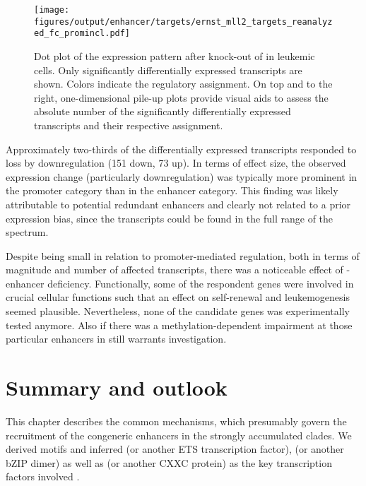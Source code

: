 \begin{figure}[!htb]
	\centering
	\texttt{[image: figures/output/enhancer/targets/ernst\_mll2\_targets\_reanalyzed\_fc\_promincl.pdf]} 
	\caption{Dot plot of the expression pattern after knock-out of   in \mllafnine leukemic cells. Only significantly differentially expressed transcripts are shown. Colors indicate the regulatory assignment. On top and to the right, one-dimensional pile-up plots provide visual aids to assess the absolute number of the significantly differentially expressed transcripts and their respective assignment.}
	\label{fig:enhancers:ernst_mll2_targets_reanalyzed_fc_promincl}
\end{figure}

Approximately two-thirds of the differentially expressed transcripts responded to  loss by downregulation (\num{151} down, \num{73} up). In terms of effect size, the observed expression change (particularly downregulation) was typically more prominent in the promoter category than in the enhancer category. This finding was likely attributable to potential redundant enhancers and clearly not related to a prior expression bias, since the transcripts could be found in the full range of the spectrum.

Despite being small in relation to promoter-mediated regulation, both in terms of magnitude and number of affected transcripts, there was a noticeable effect of -enhancer deficiency. Functionally, some of the respondent genes were involved in crucial cellular functions such that an effect on self-renewal and leukemogenesis seemed plausible. Nevertheless, none of the candidate genes was experimentally tested anymore. Also if there was a methylation-dependent impairment at those particular enhancers in \dnmtcchip still warrants investigation.

\section{Summary and outlook}
\label{chap:r:enhancers:motifs:summary}

This chapter describes the common mechanisms, which presumably govern the recruitment of the congeneric enhancers in the strongly accumulated clades. We derived motifs and inferred 
 (or another ETS transcription factor), \tfcebpa (or another bZIP dimer) as well as  (or another CXXC protein) as the key transcription factors involved .

